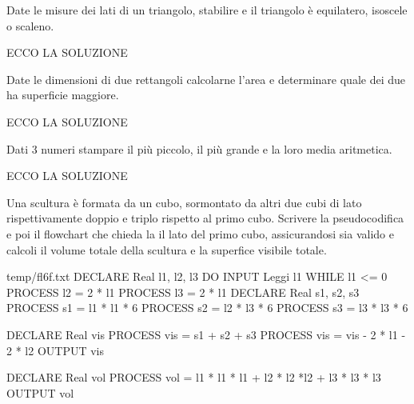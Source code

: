 \documentclass[11pt,fleqn]{book}
\begin{document}
\begin{esercizio}[1]
    Date le misure dei lati di un triangolo, stabilire e il triangolo è equilatero, isoscele o scaleno.
    \ifsoluzioni
        \solution

        ECCO LA SOLUZIONE
    \fi
\end{esercizio}

\begin{esercizio}[1]
    Date le dimensioni di due rettangoli calcolarne l'area e determinare quale dei due ha superficie maggiore.
    \ifsoluzioni
        \solution

        ECCO LA SOLUZIONE
    \fi
\end{esercizio}

\begin{esercizio}[1]
    Dati 3 numeri stampare il più piccolo, il più grande e la loro media aritmetica.
    \ifsoluzioni
        \solution

        ECCO LA SOLUZIONE
    \fi
\end{esercizio}

\begin{esercizio}[2]
    Una scultura è formata da un cubo, sormontato da altri due cubi di lato rispettivamente doppio e triplo rispetto al primo cubo. Scrivere la pseudocodifica e poi il flowchart che chieda la il lato del primo cubo, assicurandosi sia valido e calcoli il volume totale della scultura e la superfice visibile totale.
    \ifsoluzioni
        \solution

        \begin{filecontents*}{temp/fl6f.txt}
        DECLARE Real l1, l2, l3
        DO
            INPUT Leggi l1
        WHILE l1 <= 0
        PROCESS l2 = 2 * l1
        PROCESS l3 = 2 * l1
        DECLARE Real s1, s2, s3
        PROCESS s1 = l1 * l1 * 6
        PROCESS s2 = l2 * l3 * 6
        PROCESS s3 = l3 * l3 * 6
        
        DECLARE Real vis
        PROCESS vis = s1 + s2 + s3
        PROCESS vis = vis - 2 * l1 - 2 * l2
        OUTPUT vis

        DECLARE Real vol
        PROCESS vol = l1 * l1 * l1 + l2 * l2 *l2 + l3 * l3 * l3
        OUTPUT vol
        \end{filecontents*}

        \immediate{}
        
        \newpage

        \immediate{}
        
        \newpage
    \fi
\end{esercizio}
\end{document}
